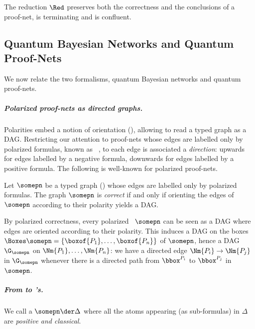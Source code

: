 \begin{proposition}
The reduction $\Red$ preserves both the correctness and the conclusions of a proof-net, is terminating and is confluent.
\end{proposition}

\subsection{Quantum Bayesian Networks and Quantum Proof-Nets}\label{sec:QBN_qpn}

We now relate the two formalisms, quantum Bayesian networks and quantum proof-nets.

\subparagraph{Polarized proof-nets as directed graphs.}

Polarities embed a notion of orientation (), allowing to read a typed graph as a DAG.
Restricting our attention to proof-nets whose edges are labelled only by polarized formulas, known as ~\cite{Laurent03}, to each edge is associated a \emph{direction}: upwards for edges labelled by a negative formula, downwards for edges labelled by a positive formula.
The following is well-known for polarized proof-nets.

\begin{lemma}\label{lem:pol_correct}
Let $\somepn$ be a typed graph () whose edges are labelled only by polarized formulas. 
The graph $\somepn$ is \emph{correct} if and only if orienting the edges of $\somepn$ according to their polarity yields a DAG.
\end{lemma}

By polarized correctness, every polarized \pn\ $\somepn$ can be seen as a DAG where edges are oriented according to their polarity. 
This induces a DAG on the boxes $\Boxes\somepn=\{\boxof{P_1}, \dots, \boxof{P_n}\}$ of $\somepn$, hence a DAG $\G_\somepn$ on $\Nm{P_1}, \dots, \Nm{P_n}$: we have a directed edge $\Nm{P_i} \rightarrow \Nm{P_j}$ in $\G_\somepn$ whenever there is a directed path from $\bbox^{P_i}$ to $\bbox^{P_j}$ in $\somepn$.

\subparagraph{From \qpns to \qqbn's.}

We call  a \qpn $\somepn \der \Delta$ where all the atoms appearing (as sub-formulas) in $\Delta$ are \emph{positive and classical}.

